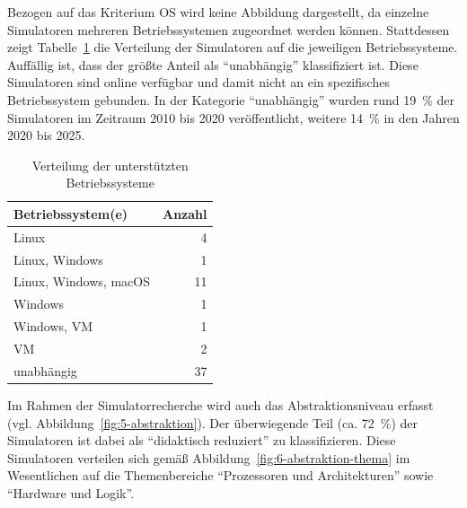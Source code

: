 Bezogen auf das Kriterium \ac{OS} wird keine Abbildung dargestellt, da einzelne Simulatoren mehreren Betriebssystemen zugeordnet werden können. Stattdessen zeigt Tabelle~\ref{tab:os} die Verteilung der Simulatoren auf die jeweiligen Betriebssysteme. Auffällig ist, dass der größte Anteil als \enquote{unabhängig} klassifiziert ist. Diese Simulatoren sind online verfügbar und damit nicht an ein spezifisches Betriebssystem gebunden. In der Kategorie \enquote{unabhängig} wurden rund 19~\% der Simulatoren im Zeitraum 2010 bis 2020 veröffentlicht, weitere 14~\% in den Jahren 2020 bis 2025.

\begin{table}[h]
	\centering
	\caption{Verteilung der unterstützten Betriebssysteme}
	\label{tab:os}
	\begin{tabular}{l r}
		\toprule
		\textbf{Betriebssystem(e)} & \textbf{Anzahl} \\
		\midrule
		Linux                     & 4  \\
		Linux, Windows            & 1  \\
		Linux, Windows, macOS     & 11 \\
		Windows                   & 1  \\
		Windows, VM               & 1  \\
		VM                        & 2  \\
		unabhängig                & 37 \\
		\bottomrule
	\end{tabular}
\end{table}

Im Rahmen der Simulatorrecherche wird auch das Abstraktionsniveau erfasst (vgl. Abbildung~\ref{fig:5-abstraktion}). Der überwiegende Teil (ca. 72~\%) der Simulatoren ist dabei als \enquote{didaktisch reduziert} zu klassifizieren. Diese Simulatoren verteilen sich gemäß Abbildung~\ref{fig:6-abstraktion-thema} im Wesentlichen auf die Themenbereiche \enquote{Prozessoren und Architekturen} sowie \enquote{Hardware und Logik}.

